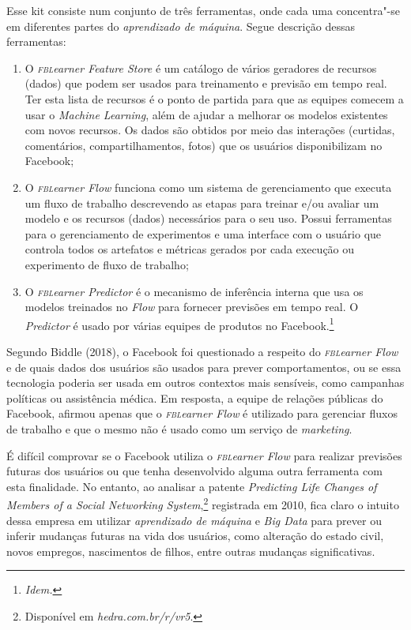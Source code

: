 Esse kit consiste num conjunto de três ferramentas, onde cada uma
concentra"-se em diferentes partes do \textit{aprendizado de máquina}. Segue
descrição dessas ferramentas: 
\begin{enumerate}
\item O \textit{\textsc{fbl}earner Feature Store} é
um catálogo de vários geradores de recursos (dados) que podem ser usados
para treinamento e previsão em tempo real. Ter esta lista de recursos é
o ponto de partida para que as equipes comecem a usar o \textit{Machine
Learning}, além de ajudar a melhorar os modelos existentes com novos
recursos. Os dados são obtidos por meio das interações (curtidas,
comentários, compartilhamentos, fotos) que os usuários disponibilizam no
Facebook; 

\item O \textit{\textsc{fbl}earner Flow} funciona como um sistema de
gerenciamento que executa um fluxo de trabalho descrevendo as etapas
para treinar e/ou avaliar um modelo e os recursos (dados) necessários
para o seu uso. Possui ferramentas para o gerenciamento de experimentos
e uma interface com o usuário que controla todos os artefatos e métricas
gerados por cada execução ou experimento de fluxo de trabalho;

\item O \textit{\textsc{fbl}earner Predictor} é o mecanismo de inferência interna que
usa os modelos treinados no \textit{Flow} para fornecer previsões em
tempo real. O \textit{Predictor} é usado por várias equipes de
produtos no Facebook.\footnote{\textit{Idem.}}
\end{enumerate}


Segundo Biddle (2018), o Facebook foi questionado a respeito do
\textit{\textsc{fbl}earner Flow} e de quais dados dos usuários são usados para
prever comportamentos, ou se essa tecnologia poderia ser usada em outros
contextos mais sensíveis, como campanhas políticas ou assistência
médica. Em resposta, a equipe de relações públicas do Facebook, afirmou
apenas que o \textit{\textsc{fbl}earner Flow} é utilizado para gerenciar fluxos
de trabalho e que o mesmo não é usado como um serviço de \textit{marketing}.

É difícil comprovar se o Facebook utiliza o \textit{\textsc{fbl}earner Flow}
para realizar previsões futuras dos usuários ou que tenha desenvolvido
alguma outra ferramenta com esta finalidade. No entanto, ao analisar a
patente \textit{Predicting Life Changes of Members of a Social
Networking System},\footnote{Disponível em \textit{hedra.com.br/r/vr5}.}
registrada em 2010, fica claro o intuito dessa empresa em utilizar
\textit{aprendizado de máquina} e \textit{Big Data} para prever ou inferir mudanças
futuras na vida dos usuários, como alteração do estado civil, novos empregos, nascimentos de filhos, entre outras mudanças
significativas.

